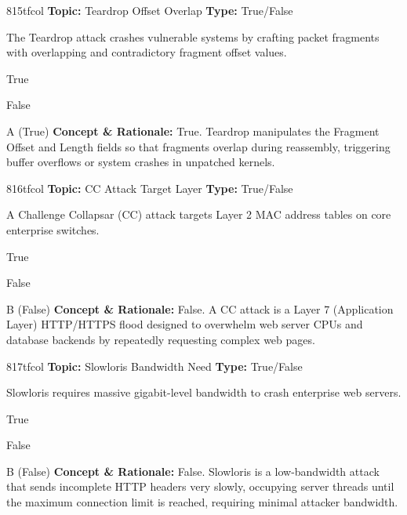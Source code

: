 \begin{qcard}{815}{tfcol}
\textcolor{darkslate!75}{\small\textbf{Topic:} Teardrop Offset Overlap \hfill \textbf{Type:} True/False}\vspace{0.4em}\par
The Teardrop attack crashes vulnerable systems by crafting packet fragments with overlapping and contradictory fragment offset values.
\begin{qoptions}
\item True
\item False
\end{qoptions}
\end{qcard}
\nopagebreak
\begin{explainbox}{A (True)}
\textbf{Concept \& Rationale:} True. Teardrop manipulates the Fragment Offset and Length fields so that fragments overlap during reassembly, triggering buffer overflows or system crashes in unpatched kernels.
\end{explainbox}

\begin{qcard}{816}{tfcol}
\textcolor{darkslate!75}{\small\textbf{Topic:} CC Attack Target Layer \hfill \textbf{Type:} True/False}\vspace{0.4em}\par
A Challenge Collapsar (CC) attack targets Layer 2 MAC address tables on core enterprise switches.
\begin{qoptions}
\item True
\item False
\end{qoptions}
\end{qcard}
\nopagebreak
\begin{explainbox}{B (False)}
\textbf{Concept \& Rationale:} False. A CC attack is a Layer 7 (Application Layer) HTTP/HTTPS flood designed to overwhelm web server CPUs and database backends by repeatedly requesting complex web pages.
\end{explainbox}

\begin{qcard}{817}{tfcol}
\textcolor{darkslate!75}{\small\textbf{Topic:} Slowloris Bandwidth Need \hfill \textbf{Type:} True/False}\vspace{0.4em}\par
Slowloris requires massive gigabit-level bandwidth to crash enterprise web servers.
\begin{qoptions}
\item True
\item False
\end{qoptions}
\end{qcard}
\nopagebreak
\begin{explainbox}{B (False)}
\textbf{Concept \& Rationale:} False. Slowloris is a low-bandwidth attack that sends incomplete HTTP headers very slowly, occupying server threads until the maximum connection limit is reached, requiring minimal attacker bandwidth.
\end{explainbox}

